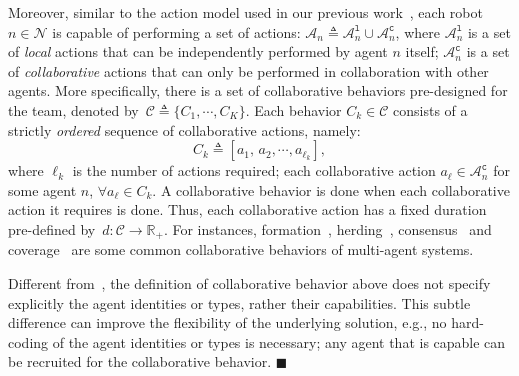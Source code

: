 Moreover, similar to the action model used in our previous work~\cite{guo2016task},
each robot $n\in \mathcal{N}$ is capable of performing a set of actions:
$\mathcal{A}_n\triangleq \mathcal{A}^{\texttt{l}}_n \cup \mathcal{A}^{\texttt{c}}_n$,
where $\mathcal{A}^{\texttt{l}}_n$ is a set of \emph{local} actions that can be independently performed by agent $n$ itself;
$\mathcal{A}^{\texttt{c}}_n$ is a set of \emph{collaborative} actions that can only be performed
in collaboration with other agents.
More specifically,
there is a set of collaborative behaviors pre-designed for the team,
denoted by~$\mathcal{C}\triangleq \{C_1,\cdots, C_K\}$.
Each behavior $C_k\in \mathcal{C}$ consists of a strictly \emph{ordered} sequence of collaborative actions, namely:
\begin{equation}\label{eq:c-k}
C_k\triangleq [a_1,\,a_2,\cdots,a_{\ell_k}],
\end{equation}
where $\ell_k$ is the number of actions required;
each collaborative action $a_\ell \in \mathcal{A}^{\texttt{c}}_n$ for some agent $n$, $\forall a_\ell \in C_k$.
A collaborative behavior is done when each collaborative action it requires is done.
Thus, each collaborative action has a fixed duration pre-defined by~$d:\mathcal{C}\rightarrow \mathbb{R}_{+}$.
For instances, formation~\cite{chen2005formation}, herding~\cite{pan2007multi},
 consensus~\cite{li2009consensus} and coverage~\cite{mesbahi2010graph}
 are some common collaborative behaviors of multi-agent systems.



\begin{remark}\label{rm:collaborative}
Different from~\cite{luo2021temporal,sahin2019multirobot, jones2019scratchs},
the definition of collaborative behavior above does not specify explicitly
the agent identities or {types}, rather their capabilities.
This subtle difference can improve the flexibility of the underlying solution,
e.g.,  no hard-coding of the agent identities or types is necessary;
any agent that is capable can be recruited for the collaborative behavior.
\hfill $\blacksquare$
\end{remark}



